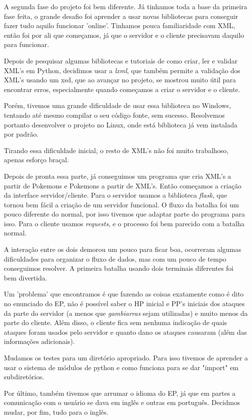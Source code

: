 \documentclass[a4paper]{article}
\begin{document}
  A segunda fase do projeto foi bem diferente. Já tinhamos toda a base da primeira fase
feita, o grande desafio foi aprender a usar novas bibliotecas para conseguir fazer tudo
aquilo funcionar 'online'. Tinhamos pouca familiaridade com XML, então foi por ali que 
começamos, já que o servidor e o cliente precisavam daquilo para funcionar.

   Depois de pesquisar algumas bibliotecas e tutoriais de como criar, ler e validar XML's
em Python, decidimos usar a \emph{lxml}, que também permite a validação dos XML's usando
um xsd, que ao avançar no projeto, se mostrou muito útil para encontrar erros, especialmente quando
começamos a criar o servidor e o cliente.

   Porém, tivemos uma grande dificuldade de usar essa biblioteca no Windows, tentando até
mesmo compilar o seu código fonte, sem sucesso. Resolvemos portanto desenvolver o projeto no
Linux, onde está biblioteca já vem instalada por padrão. 

    Tirando essa dificuldade inicial, o resto de XML's não foi muito trabalhoso, apenas
esforço braçal.

   Depois de pronta essa parte, já conseguimos um programa que cria XML's a partir de
Pokemons e Pokemons a partir de XML's. Então começamos a criação da interface servidor/cliente.
Para o servidor usamos a biblioteca \emph{flask}, que tornou bem fácil a criação de um servidor
funcional. O fluxo da batalha foi um pouco diferente do normal, por isso tivemos que adaptar
parte do programa para isso. Para o cliente usamos \emph{requests}, e o processo foi bem parecido
com a batalha normal.

   A interação entre os dois demorou um pouco para ficar boa, ocorreram algumas dificuldades
para organizar o fluxo de dados, mas com um pouco de tempo conseguimos resolver. A primeira batalha
usando dois terminais diferentes foi bem divertida.

   Um 'problema' que encontramos é que fazendo as coisas exatamente como é dito no enunciado
do EP, não é possível saber o HP inicial e PP's iniciais dos ataques da parte do servidor (a 
menos que \emph{gambiarras} sejam utilizadas) e muito menos da parte do cliente. Além disso, o
cliente fica sem nenhuma indicação de quais ataques foram usados pelo servidor e quanto dano
os ataques causaram (além das informações adicionais).

   Mudamos os testes para um diretório apropriado. Para isso tivemos de aprender a usar o
sistema de módulos de python e como funciona para se dar "import" em subdiretórios.

   Por último, também tivemos que arrumar o idioma do EP, já que em partes a comunicação com
o usuário se dava em inglês e outras em português. Decidmos mudar, por fim, tudo para o inglês.
\end{document}
